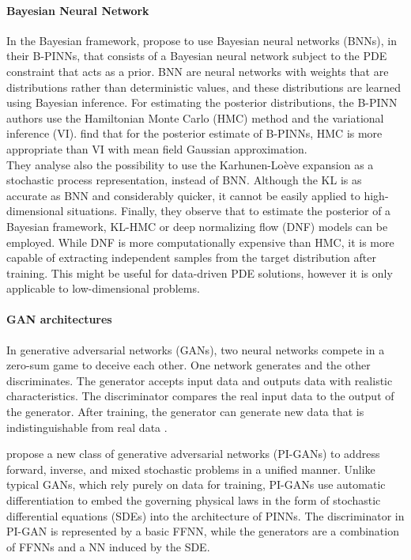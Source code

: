 \documentclass[pdflatex,sn-basic]{sn-jnl}%
\theoremstyle{thmstyleone}%
\theoremstyle{thmstyletwo}%
\theoremstyle{thmstylethree}%
\begin{document}
\paragraph{Bayesian Neural Network}
In the Bayesian framework, \cite{Yan2021_BPinnsBayesian_MenYMK} propose to use Bayesian neural networks (BNNs), in their B-PINNs, that consists of a Bayesian neural network subject to the PDE constraint that acts as a prior. 
BNN are neural networks with weights that are distributions rather than deterministic values, and these distributions are learned using Bayesian inference.  %
For estimating the posterior distributions, the B-PINN authors use  the Hamiltonian Monte Carlo (HMC) method and the variational inference (VI). 
%
\cite{Yan2021_BPinnsBayesian_MenYMK} find that for the posterior estimate of B-PINNs, HMC is more appropriate than VI with mean field Gaussian approximation. 
\\
\noindent
They analyse also the possibility to use the  Karhunen-Loève expansion as a stochastic process representation, instead of BNN.
Although the KL is as accurate as BNN and considerably quicker, it cannot be easily applied to high-dimensional situations. 
%
Finally, they observe that to estimate the posterior of a Bayesian framework, KL-HMC or deep normalizing flow (DNF) models can be employed.
While DNF is more computationally expensive than HMC, it is more capable of extracting independent samples from the target distribution after training. 
This might be useful for data-driven PDE solutions, however it is only applicable to low-dimensional problems.


\paragraph{GAN architectures}
In generative adversarial networks (GANs), two neural networks compete in a zero-sum game to deceive each other.
One network generates and the other discriminates.
The generator accepts input data and outputs data with realistic characteristics.
The discriminator compares the real input data to the output of the generator.
After training, the generator can generate new data that is indistinguishable from real data
\citep{Ber2019_SurveyDeepLearning_BucBBCC}.

\cite{Yan2020_PhysicsInformedGenerative_ZhaYZK} propose a new class of generative adversarial networks (PI-GANs) to address forward, inverse, and mixed stochastic problems in a unified manner. Unlike typical GANs, which rely purely on data for training, PI-GANs use automatic differentiation to embed the governing physical laws in the form of stochastic differential equations (SDEs) into the architecture of PINNs. 
The discriminator in PI-GAN is represented by a basic FFNN, while the generators are a combination of FFNNs and a NN induced by the SDE. 
\end{document}
